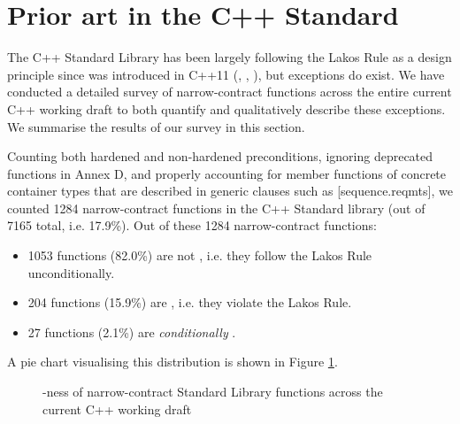 
\section{Prior art in the C++ Standard}
\label{sec:priorart}

The C++ Standard Library has been largely following the Lakos Rule as a design principle since  was introduced in C++11 (\cite{N2855}, \cite{N3248}, \cite{N3279}), but exceptions do exist. We have conducted a detailed survey of narrow-contract functions across the entire current C++ working draft \cite{N5046} to both quantify and qualitatively describe these exceptions. We summarise the results of our survey in this section.

Counting both hardened and non-hardened preconditions, ignoring deprecated functions in Annex D, and properly accounting for member functions of concrete container types that are described in generic clauses such as [sequence.reqmts], we counted 1284 narrow-contract functions in the C++ Standard library (out of 7165 total, i.e. 17.9\%). Out of these 1284 narrow-contract functions:
\begin{itemize}
\item 1053 functions (82.0\%) are not , i.e. they follow the Lakos Rule unconditionally. 
\item 204 functions (15.9\%) are , i.e. they violate the Lakos Rule. 
\item 27 functions (2.1\%) are \emph{conditionally} . 
\end {itemize}
A pie chart visualising this distribution is shown in Figure \ref{fig:piechart}. 

\vspace{5mm} %
\begin{figure}[b!]
    \centering
    \caption{-ness of narrow-contract Standard Library functions across the current C++ working draft}
    \label{fig:piechart}
\end{figure}

